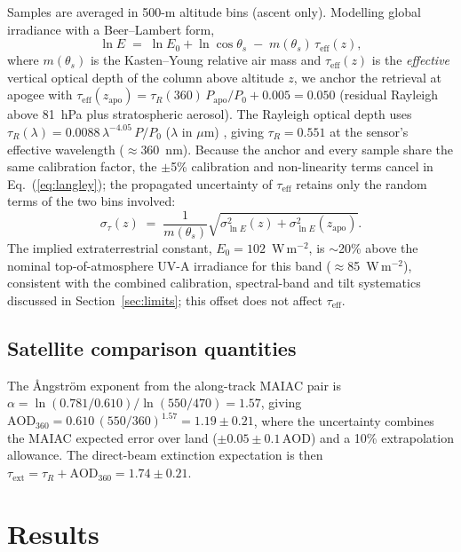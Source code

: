 \documentclass[11pt,a4paper]{article}
\begin{document}
Samples are averaged in 500-m altitude bins (ascent only). Modelling global irradiance
with a Beer--Lambert form,
\begin{equation}
\ln E \;=\; \ln E_0 + \ln\cos\theta_s \;-\; m(\theta_s)\,\tau_{\mathrm{eff}}(z),
\label{eq:langley}
\end{equation}
where $m(\theta_s)$ is the Kasten--Young relative air mass \cite{kasten1989} and
$\tau_{\mathrm{eff}}(z)$ is the \emph{effective} vertical optical depth of the column above
altitude $z$, we anchor the retrieval at apogee with
$\tau_{\mathrm{eff}}(z_{\mathrm{apo}}) = \tau_R(360)\,P_{\mathrm{apo}}/P_0 + 0.005 = 0.050$
(residual Rayleigh above 81~hPa plus stratospheric aerosol). The Rayleigh optical depth
uses $\tau_R(\lambda) = 0.0088\,\lambda^{-4.05}\,P/P_0$ ($\lambda$ in $\mu$m)
\cite{bodhaine1999}, giving $\tau_R = 0.551$ at the sensor's effective wavelength
($\approx$360~nm). Because the anchor and every sample share the same calibration factor,
the $\pm$5\% calibration and non-linearity terms cancel in
Eq.~(\ref{eq:langley}); the propagated uncertainty of $\tau_{\mathrm{eff}}$ retains only
the random terms of the two bins involved:
\begin{equation}
\sigma_{\tau}(z) \;=\; \frac{1}{m(\theta_s)}
\sqrt{\sigma_{\ln E}^2(z) + \sigma_{\ln E}^2(z_{\mathrm{apo}})}.
\end{equation}
The implied extraterrestrial constant, $E_0 = 102$~W\,m$^{-2}$, is $\sim$20\% above the
nominal top-of-atmosphere UV-A irradiance for this band ($\approx$85~W\,m$^{-2}$),
consistent with the combined calibration, spectral-band and tilt systematics discussed in
Section~\ref{sec:limits}; this offset does not affect $\tau_{\mathrm{eff}}$.

\subsection{Satellite comparison quantities}

The \r{A}ngstr\"om exponent \cite{angstrom1929} from the along-track MAIAC pair is
$\alpha = \ln(0.781/0.610)/\ln(550/470) = 1.57$, giving
$\mathrm{AOD}_{360} = 0.610\,(550/360)^{1.57} = 1.19 \pm 0.21$, where the uncertainty
combines the MAIAC expected error over land ($\pm 0.05 \pm 0.1\,\mathrm{AOD}$) and a 10\%
extrapolation allowance. The direct-beam extinction expectation is then
$\tau_{\mathrm{ext}} = \tau_R + \mathrm{AOD}_{360} = 1.74 \pm 0.21$.

\section{Results}
\end{document}
